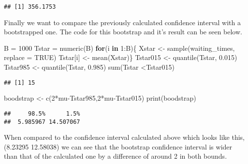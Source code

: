 \documentclass[
]{article}
\newenvironment{Shaded}{\begin{snugshade}}{\end{snugshade}}
\newcommand{\AttributeTok}[1]{\textcolor[rgb]{0.77,0.63,0.00}{#1}}
\newcommand{\ConstantTok}[1]{\textcolor[rgb]{0.00,0.00,0.00}{#1}}
\newcommand{\ControlFlowTok}[1]{\textcolor[rgb]{0.13,0.29,0.53}{\textbf{#1}}}
\newcommand{\DecValTok}[1]{\textcolor[rgb]{0.00,0.00,0.81}{#1}}
\newcommand{\FloatTok}[1]{\textcolor[rgb]{0.00,0.00,0.81}{#1}}
\newcommand{\FunctionTok}[1]{\textcolor[rgb]{0.00,0.00,0.00}{#1}}
\newcommand{\NormalTok}[1]{#1}
\newcommand{\OtherTok}[1]{\textcolor[rgb]{0.56,0.35,0.01}{#1}}
\newcommand{\SpecialCharTok}[1]{\textcolor[rgb]{0.00,0.00,0.00}{#1}}
\begin{document}
\begin{verbatim}
## [1] 356.1753
\end{verbatim}

Finally we want to compare the previously calculated confidence interval
with a bootstrapped one. The code for this bootstrap and it's result can
be seen below.

\begin{Shaded}
\begin{Highlighting}[]
\NormalTok{B }\OtherTok{=} \DecValTok{1000}
\NormalTok{Tstar }\OtherTok{=} \FunctionTok{numeric}\NormalTok{(B)}
\ControlFlowTok{for}\NormalTok{(i }\ControlFlowTok{in} \DecValTok{1}\SpecialCharTok{:}\NormalTok{B)\{}
\NormalTok{  Xstar }\OtherTok{\textless{}{-}} \FunctionTok{sample}\NormalTok{(waiting\_times, }\AttributeTok{replace =} \ConstantTok{TRUE}\NormalTok{)}
\NormalTok{  Tstar[i] }\OtherTok{\textless{}{-}} \FunctionTok{mean}\NormalTok{(Xstar)\}}
\NormalTok{Tstar015 }\OtherTok{\textless{}{-}} \FunctionTok{quantile}\NormalTok{(Tstar, }\FloatTok{0.015}\NormalTok{)}
\NormalTok{Tstar985 }\OtherTok{\textless{}{-}} \FunctionTok{quantile}\NormalTok{(Tstar, }\FloatTok{0.985}\NormalTok{)}
\FunctionTok{sum}\NormalTok{(Tstar }\SpecialCharTok{\textless{}}\NormalTok{Tstar015)}
\end{Highlighting}
\end{Shaded}

\begin{verbatim}
## [1] 15
\end{verbatim}

\begin{Shaded}
\begin{Highlighting}[]
\NormalTok{boodstrap }\OtherTok{\textless{}{-}} \FunctionTok{c}\NormalTok{(}\DecValTok{2}\SpecialCharTok{*}\NormalTok{mu}\SpecialCharTok{{-}}\NormalTok{Tstar985,}\DecValTok{2}\SpecialCharTok{*}\NormalTok{mu}\SpecialCharTok{{-}}\NormalTok{Tstar015)}
\FunctionTok{print}\NormalTok{(boodstrap)}
\end{Highlighting}
\end{Shaded}

\begin{verbatim}
##     98.5%      1.5% 
##  5.985967 14.507067
\end{verbatim}

When compared to the confidence interval calculated above which looks
like this, (8.23295 12.58038) we can see that the bootstrap confidence
interval is wider than that of the calculated one by a difference of
around 2 in both bounds.
\end{document}
